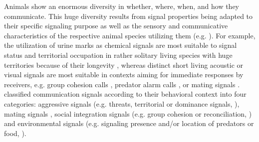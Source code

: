 \documentclass[11pt,pdftex]{article}
\begin{document}
Animals show an enormous diversity in whether, where, when, and how they communicate. This huge diversity results from signal properties being adapted to their specific signaling purpose as well as the sensory and communicative characteristics of the respective animal species utilizing them (e.g. \citealp{Fernald2014}). For example, the utilization of urine marks as chemical signals are most suitable to signal status and territorial occupation in rather solitary living species with huge territories because of their longevity  \citep{Cornhill2020}, whereas distinct short living acoustic or visual signals are most suitable in contexts aiming for immediate responses by receivers, e.g. group cohesion calls \citep{Demartsev2018}, predator alarm calls \citep{Schibler2007}, or mating signals \citep{Ligon2018}. \citet{Bandbury2011} classified communication signals according to their behavioral context into four categories: aggressive signals (e.g. threats, territorial or dominance signals, \citealp{Cluttonbrock1979, Kappeler2008, Fernald2014, Bolt2019, Kareklas2019, Cornhill2020}), mating signals \citep{Ritschard2010, Henninger2018, Ligon2018}, social integration signals (e.g. group cohesion or reconciliation, \citealp{Cheney1995, Schamberg2016, Demartsev2018}) and environmental signals (e.g. signaling presence and/or location of predators or food, \citealp{Seyfarth1980, Seeley1997, Schibler2007}). 
\end{document}
